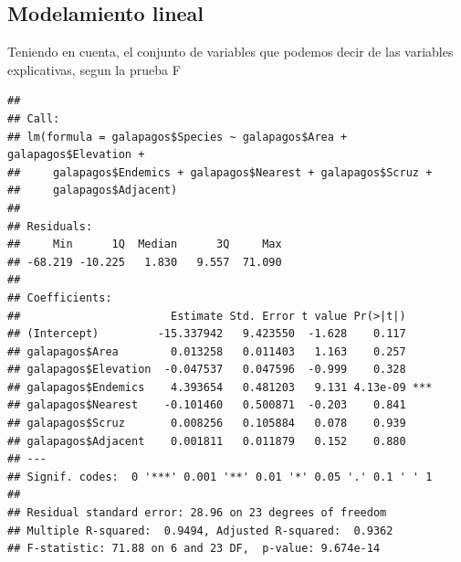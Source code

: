 \documentclass[
]{book}
\newenvironment{Shaded}{\begin{snugshade}}{\end{snugshade}}
\newcommand{\KeywordTok}[1]{\textcolor[rgb]{0.13,0.29,0.53}{\textbf{#1}}}
\newcommand{\NormalTok}[1]{#1}
\newcommand{\OperatorTok}[1]{\textcolor[rgb]{0.81,0.36,0.00}{\textbf{#1}}}
\newcommand{\StringTok}[1]{\textcolor[rgb]{0.31,0.60,0.02}{#1}}
\begin{document}
\hypertarget{modelamiento-lineal}{%
\subsection{Modelamiento lineal}\label{modelamiento-lineal}}

Teniendo en cuenta, el conjunto de variables que podemos decir de las variables explicativas, segun la prueba F

\begin{Shaded}
\end{Shaded}

\begin{verbatim}
## 
## Call:
## lm(formula = galapagos$Species ~ galapagos$Area + galapagos$Elevation + 
##     galapagos$Endemics + galapagos$Nearest + galapagos$Scruz + 
##     galapagos$Adjacent)
## 
## Residuals:
##     Min      1Q  Median      3Q     Max 
## -68.219 -10.225   1.830   9.557  71.090 
## 
## Coefficients:
##                       Estimate Std. Error t value Pr(>|t|)    
## (Intercept)         -15.337942   9.423550  -1.628    0.117    
## galapagos$Area        0.013258   0.011403   1.163    0.257    
## galapagos$Elevation  -0.047537   0.047596  -0.999    0.328    
## galapagos$Endemics    4.393654   0.481203   9.131 4.13e-09 ***
## galapagos$Nearest    -0.101460   0.500871  -0.203    0.841    
## galapagos$Scruz       0.008256   0.105884   0.078    0.939    
## galapagos$Adjacent    0.001811   0.011879   0.152    0.880    
## ---
## Signif. codes:  0 '***' 0.001 '**' 0.01 '*' 0.05 '.' 0.1 ' ' 1
## 
## Residual standard error: 28.96 on 23 degrees of freedom
## Multiple R-squared:  0.9494,	Adjusted R-squared:  0.9362 
## F-statistic: 71.88 on 6 and 23 DF,  p-value: 9.674e-14
\end{verbatim}
\end{document}
